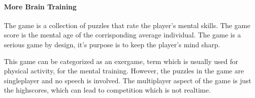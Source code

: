 \documentclass[12pt]{article}
\begin{document}
\clearpage

\paragraph{More Brain Training} \cite{mbt}
The game is a collection of puzzles that rate the player's mental skills. The game score is the mental age of the corrisponding average individual. The game is a serious game by design, it's purpose is to keep the player's mind sharp.

\vspace{0.4cm}
\vspace{0.4cm}

This game can be categorized as an exergame, term which is usually used for physical activity, for the mental training. However, the puzzles in the game are singleplayer and no speech is involved. The multiplayer aspect of the game is just the highscores, which can lead to competition which is not realtime.

\vfill
{}
\end{document}
